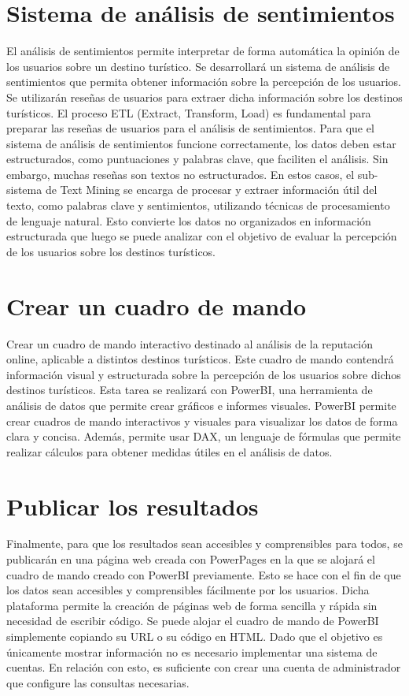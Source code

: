 \section {Sistema de análisis de sentimientos}
El análisis de sentimientos permite interpretar de forma automática la opinión de los usuarios sobre un destino turístico.
Se desarrollará un sistema de análisis de sentimientos que permita obtener información sobre la percepción de los usuarios.
Se utilizarán reseñas de usuarios para extraer dicha información sobre los destinos turísticos.
El proceso ETL (Extract, Transform, Load) es fundamental para preparar las reseñas de usuarios para el análisis de sentimientos.
Para que el sistema de análisis de sentimientos funcione correctamente, los datos deben estar estructurados, como puntuaciones y palabras clave, que faciliten el análisis. 
Sin embargo, muchas reseñas son textos no estructurados. 
En estos casos, el sub-sistema de Text Mining se encarga de procesar y extraer información útil del texto, como palabras clave y sentimientos, utilizando técnicas de procesamiento de lenguaje natural. 
Esto convierte los datos no organizados en información estructurada que luego se puede analizar con el objetivo de evaluar la percepción de los usuarios sobre los destinos turísticos.

\section {Crear un cuadro de mando}
Crear un cuadro de mando interactivo destinado al análisis de la reputación online, aplicable a distintos destinos turísticos.
Este cuadro de mando contendrá información visual y estructurada sobre la percepción de los usuarios sobre dichos destinos turísticos.
Esta tarea se realizará con PowerBI, una herramienta de análisis de datos que permite crear gráficos e informes visuales.
PowerBI permite crear cuadros de mando interactivos y visuales para visualizar los datos de forma clara y concisa. 
Además, permite usar DAX, un lenguaje de fórmulas que permite realizar cálculos para obtener medidas útiles en el análisis de datos.

\section {Publicar los resultados}
Finalmente, para que los resultados sean accesibles y comprensibles para todos, se publicarán en una página web creada con PowerPages en la que se alojará el cuadro de mando creado con PowerBI previamente. 
Esto se hace con el fin de que los datos sean accesibles y comprensibles fácilmente por los usuarios.
Dicha plataforma permite la creación de páginas web de forma sencilla y rápida sin necesidad de escribir código. 
Se puede alojar el cuadro de mando de PowerBI simplemente copiando su URL o su código en HTML.
Dado que el objetivo es únicamente mostrar información no es necesario implementar una sistema de cuentas.
En relación con esto, es suficiente con crear una cuenta de administrador que configure las consultas necesarias.